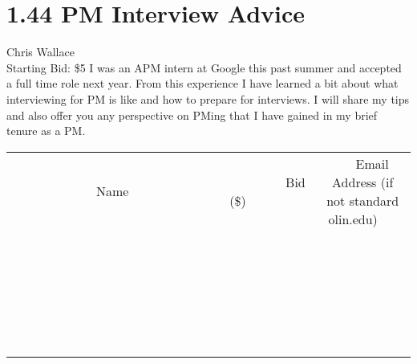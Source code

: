 \documentclass[11pt]{article}
\begin{document}
\section*{1.44 PM Interview Advice}
Chris Wallace
\\
Starting Bid: \$5
\newline
I was an APM intern at Google this past summer and accepted a full time role next year. From this experience I have learned a bit about what interviewing for PM is like and how to prepare for interviews. I will share my tips and also offer you any perspective on PMing that I have gained in my brief tenure as a PM.
\\[6ex]
\begin{tabular}{c c c}
~~~~~~~~~~~~~Name~~~~~~~~~~~~~ & ~~~~~~~~~Bid (\$)~~~~~~~~~  & ~~~Email Address (if not standard olin.edu)~~~\\
 & & \\
\hline
 & & \\
\hline
 & & \\
\hline
 & & \\
\hline
 & & \\
\hline
 & & \\
\hline
 & & \\
\hline
 & & \\
\hline
 & & \\
\hline
 & & \\
\hline
 & & \\
\hline
 & & \\
\hline
 & & \\
\hline
 & & \\
\hline
 & & \\
\hline
 & & \\
\hline
 & & \\
\hline
 & & \\
\hline
 & & \\
\hline
 & & \\
\hline
 & & \\
\hline
 & & \\
\hline
 & & \\
\hline
 & & \\
\hline
 & & \\
\hline
 & & \\
\hline
\end{tabular}
\newpage
\end{document}
